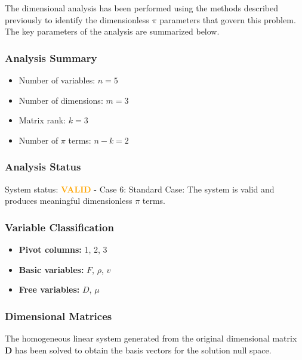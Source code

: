 The dimensional analysis has been performed using the methods described previously to identify the dimensionless $\pi$ parameters that govern this problem. The key parameters of the analysis are summarized below.

\subsubsection*{Analysis Summary}
\begin{itemize}
\item Number of variables: $n = 5$
\item Number of dimensions: $m = 3$
\item Matrix rank: $k = 3$
\item Number of $\pi$ terms: $n - k = 2$
\end{itemize}

\subsubsection*{Analysis Status}
System status: \textcolor{orange}{\textbf{VALID}} - Case 6: Standard Case: The system is valid and produces meaningful dimensionless $\pi$ terms.

\subsubsection*{Variable Classification}
\begin{itemize}
\item \textbf{Pivot columns:} 1, 2, 3
\item \textbf{Basic variables:} $F$, $\rho$, $v$
\item \textbf{Free variables:} $D$, $\mu$
\end{itemize}

\subsubsection*{Dimensional Matrices}
The homogeneous linear system generated from the original dimensional matrix $\mathbf{D}$ has been solved to obtain the basis vectors for the solution null space.

